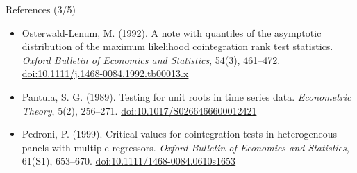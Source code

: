 \begin{frame}{References (3/5)}
\begin{itemize}
    \item Osterwald-Lenum, M. (1992). A note with quantiles of the asymptotic distribution of the maximum likelihood cointegration rank test statistics. \textit{Oxford Bulletin of Economics and Statistics}, 54(3), 461--472. \href{https://doi.org/10.1111/j.1468-0084.1992.tb00013.x}{doi:10.1111/j.1468-0084.1992.tb00013.x}
    \item Pantula, S. G. (1989). Testing for unit roots in time series data. \textit{Econometric Theory}, 5(2), 256--271. \href{https://doi.org/10.1017/S0266466600012421}{doi:10.1017/S0266466600012421}
    \item Pedroni, P. (1999). Critical values for cointegration tests in heterogeneous panels with multiple regressors. \textit{Oxford Bulletin of Economics and Statistics}, 61(S1), 653--670. \href{https://doi.org/10.1111/1468-0084.0610s1653}{doi:10.1111/1468-0084.0610s1653}
\end{itemize}
\end{frame}

